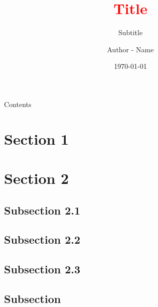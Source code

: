 \documentclass[aspectratio=169,11pt]{beamer}
\title[T]{\textcolor{red}{Title}}
\date{\today}
\subtitle{Subtitle}
\author[]{Author - Name}
\institute[University-Faculty-School]{
        {\large \textbf{University}} %
       \\%
        {\large \textbf{Faculty} } %
          \\%
       {\large \textbf{Professional School}}\\
       \begin{center}
        {\large course (acronym)} \vspace{2mm} \\
        {\large Teacher's name }
       \end{center}
     }
\begin{document}
  \begin{frame}[t] 
    \maketitle
  \end{frame}


  \begin{frame}[t,plain]{Contents}
   	\tableofcontents
  \end{frame}

  
\section{Section 1}

  \begin{frame}[t,plain]
    \lipsum[1]
  \end{frame}
   
   
   
   
\section{Section 2}

   \begin{frame}[t,plain]
   	\lipsum[2]
   \end{frame}


  \subsection{Subsection 2.1}
  \begin{frame}{}
  	\lipsum[3]
  \end{frame}
  
  \subsection{Subsection 2.2}
  \begin{frame}{}
  	\lipsum[4]
  \end{frame}


  \subsection{Subsection 2.3}
  \begin{frame}{}
  	\lipsum[5]
  \end{frame}
  
  
  \subsection{Subsection}
  \begin{frame}{}
  	\lipsum[6]
  \end{frame}
  
\end{document}
